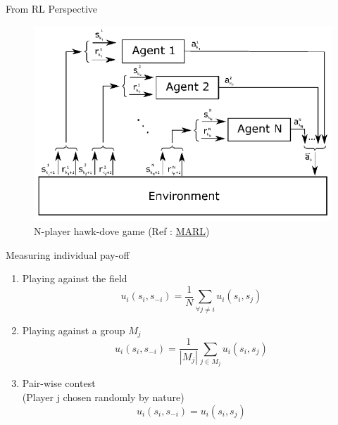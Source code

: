 \documentclass{IFES-beamer}
\begin{document}
        \begin{frame}{From RL Perspective}
            \begin{figure}[H]
                \centering
                \includegraphics[scale=0.3]{Images/Multi_RL.png}
                \caption{N-player hawk-dove game (Ref : \href{https://towardsdatascience.com/modern-game-theory-and-multi-agent-reinforcement-learning-systems-e8c936d6de42}{MARL})}
            \end{figure}
        \end{frame}
        
        \begin{frame}{Measuring individual pay-off}
            \begin{enumerate}
                \item Playing against the field $$u_i(s_i, s_{-i}) = \frac{1}{N} \sum_{\forall j \neq i} u_i(s_i, s_j)$$
                \item Playing against a group $M_j$ $$u_i(s_i, s_{-i}) = \frac{1}{|M_j|} \sum_{j \in M_j} u_i(s_i, s_j)$$
                \item Pair-wise contest \\(Player j chosen randomly by nature) $$u_i(s_i, s_{-i}) = u_i(s_i, s_j)$$
            \end{enumerate}
        \end{frame}
        
\end{document}
